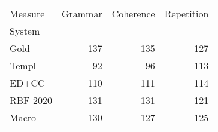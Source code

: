 \begin{tabular}{lrrr}
\toprule
Measure & Grammar & Coherence & Repetition \\
System &  &  &  \\
\midrule
Gold & 137 & 135 & 127 \\
Templ & 92 & 96 & 113 \\
ED+CC & 110 & 111 & 114 \\
RBF-2020 & 131 & 131 & 121 \\
Macro & 130 & 127 & 125 \\
\bottomrule
\end{tabular}
